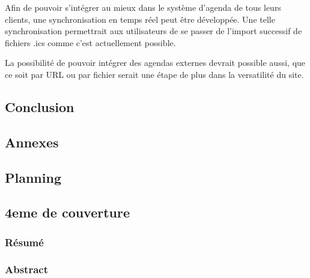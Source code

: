 \documentclass[a4paper, 11pt]{report}
\begin{document}
    Afin de pouvoir s'intégrer au mieux dans le système d'agenda de tous leurs clients, une synchronisation en temps réel peut être développée. Une telle synchronisation permettrait aux utilisateurs de se passer de l'import successif de fichiers .ics comme c'est actuellement possible.

    La possibilité de pouvoir intégrer des agendas externes devrait possible aussi, que ce soit par URL ou par fichier serait une étape de plus dans la versatilité du site.

\chapter{Conclusion}

\begin{appendix}
    \part{Annexes}
        \chapter{Planning}
\end{appendix}

\chapter{4eme de couverture}
    \section{Résumé}
    \section{Abstract}
\end{document}
